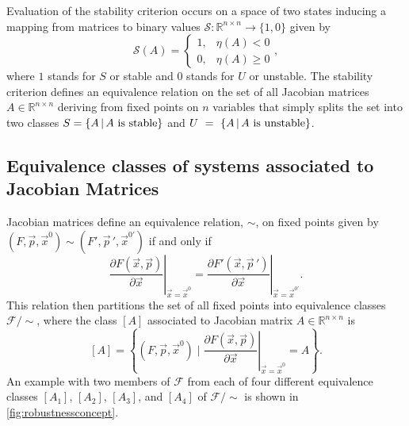 Evaluation of the stability criterion occurs on a space of two states inducing a mapping from matrices to binary values $\mathcal{S} \colon \mathbb{R}^{n \times n} \rightarrow \{ 1, 0 \}$ given by
 \begin{equation}\label{eq:stabeval}
   \mathcal{S}(A) = \left\{
     \begin{array}{lr}
       1, & \eta (A) < 0\\
       0, & \eta (A) \geq 0
     \end{array},
   \right.
\end{equation}
where $1$ stands for $S$ or stable and $0$ stands for $U$ or unstable. The stability criterion defines an equivalence relation on the set of all Jacobian matrices $A \in \mathbb{R}^{n \times n}$ deriving from fixed points on $n$ variables that simply splits the set into two classes $S=\{ A \, | \, A \hbox{ is stable}  \}$ and $U~=~\{ A \, | \, A \hbox{ is unstable} \}$.

\subsection{Equivalence classes of systems associated to Jacobian Matrices}
Jacobian matrices define an equivalence relation, $\sim$, on fixed points given by $(F,\vec{p},\vec{x}^0) \sim (F',\vec{p}\,',\vec{x}^{0'}) $ if and only if
\begin{equation}\label{eq:jaceqrel}
\left. \frac{\partial F(\vec{x},\vec{p})}{\partial \vec{x}} \right|_{\vec{x} = \vec{x}^0} =
\left. \frac{\partial F'(\vec{x},\vec{p}\,')}{\partial \vec{x}} \right|_{\vec{x} = \vec{x}^{0'}}.
\end{equation}
This relation then partitions the set of all fixed points into equivalence classes $\mathcal{F}/{\sim}$, where the class $[A]$ associated to Jacobian matrix $A \in \mathbb{R}^{n \times n}$ is
\begin{equation}\label{eq:jaceqs}
[A] = \left\{ (F,\vec{p},\vec{x}^0) \; | \; \left. \frac{\partial F(\vec{x},\vec{p})}{\partial \vec{x}} \right|_{\vec{x} = \vec{x}^0} = A \right\}.
\end{equation}
An example with two members of $\mathcal{F}$ from each of four different equivalence classes $[A_1]$, $[A_2]$, $[A_3]$, and $[A_4]$ of $\mathcal{F}/{\sim}$ is shown in \ref{fig:robustnessconcept}.

